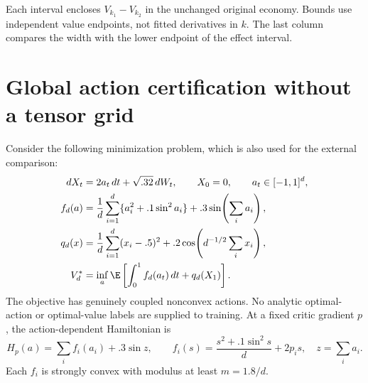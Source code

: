 \begin{table}[t]\centering\small
\caption{Accuracy-calibrated optimal welfare losses from higher adjustment costs}\label{r10:tab:cost-effects}

\par\smallskip\footnotesize Each interval encloses $V_{k_1}-V_{k_2}$ in the unchanged original economy. Bounds use independent value endpoints, not fitted derivatives in $k$. The last column compares the width with the lower endpoint of the effect interval.
\end{table}



\section{Global action certification without a tensor grid}\label{r9:action}
Consider the following minimization problem, which is also used for the external comparison:
\begin{align}
 dX_t&=2a_t\,dt+\sqrt{.32}\,dW_t,\qquad X_0=0,
       \qquad a_t\in[-1,1]^d,\\
 f_d(a)&=\frac1d\sum_{i=1}^d\{a_i^2+.1\sin^2a_i\}
                 +.3\sin\!\left(\sum_i a_i\right),\\
 q_d(x)&=\frac1d\sum_{i=1}^d(x_i-.5)^2
                 +.2\cos\!\left(d^{-1/2}\sum_i x_i\right),\label{r9:nonconvex}\\
 V_d^*&=\inf_a\E\left[\int_0^1 f_d(a_t)\,dt+q_d(X_1)\right].\notag
\end{align}
The objective has genuinely coupled nonconvex actions. No analytic optimal-action or optimal-value labels are supplied to training. At a fixed critic gradient $p$, the action-dependent Hamiltonian is
\[
 H_p(a)=\sum_i f_i(a_i)+.3\sin z,\qquad
 f_i(s)=\frac{s^2+.1\sin^2s}{d}+2p_is,\quad z=\sum_i a_i.
\]
Each $f_i$ is strongly convex with modulus at least $m=1.8/d$.


